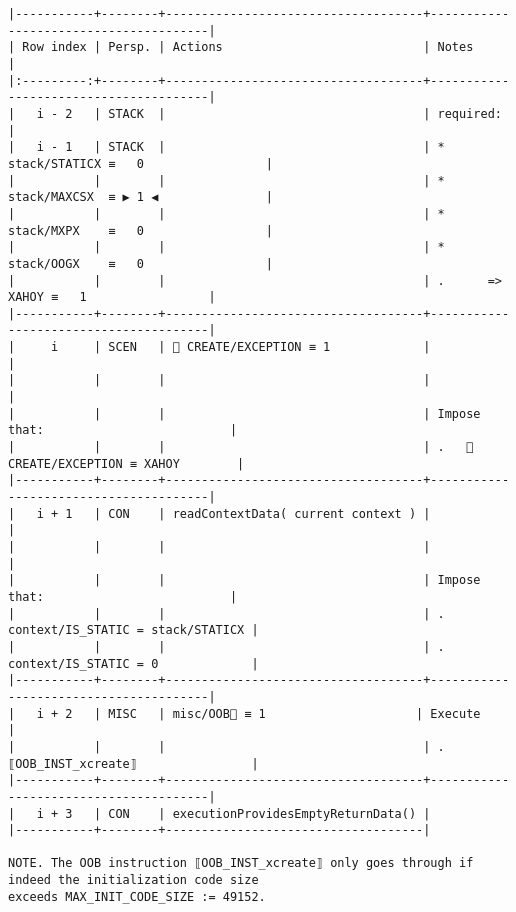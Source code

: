 \documentclass[varwidth=\maxdimen,margin=0.5cm,multi={verbatim}]{standalone}
\begin{document}
\begin{verbatim}
|-----------+--------+------------------------------------+---------------------------------------|
| Row index | Persp. | Actions                            | Notes                                 |
|:---------:+--------+------------------------------------+---------------------------------------|
|   i - 2   | STACK  |                                    | required:                             |
|   i - 1   | STACK  |                                    | * stack/STATICX ≡   0                 |
|           |        |                                    | * stack/MAXCSX  ≡ ▶ 1 ◀               |
|           |        |                                    | * stack/MXPX    ≡   0                 |
|           |        |                                    | * stack/OOGX    ≡   0                 |
|           |        |                                    | .      => XAHOY ≡   1                 |
|-----------+--------+------------------------------------+---------------------------------------|
|     i     | SCEN   |  CREATE/EXCEPTION ≡ 1             |                                       |
|           |        |                                    |                                       |
|           |        |                                    | Impose that:                          |
|           |        |                                    | .    CREATE/EXCEPTION ≡ XAHOY        |
|-----------+--------+------------------------------------+---------------------------------------|
|   i + 1   | CON    | readContextData( current context ) |                                       |
|           |        |                                    |                                       |
|           |        |                                    | Impose that:                          |
|           |        |                                    | .   context/IS_STATIC = stack/STATICX |
|           |        |                                    | .   context/IS_STATIC = 0             |
|-----------+--------+------------------------------------+---------------------------------------|
|   i + 2   | MISC   | misc/OOB🚩 ≡ 1                     | Execute                               |
|           |        |                                    | .   ⟦OOB_INST_xcreate⟧                |
|-----------+--------+------------------------------------+---------------------------------------|
|   i + 3   | CON    | executionProvidesEmptyReturnData() |
|-----------+--------+------------------------------------|

NOTE. The OOB instruction ⟦OOB_INST_xcreate⟧ only goes through if indeed the initialization code size
exceeds MAX_INIT_CODE_SIZE := 49152.

\end{verbatim}
\end{document}
